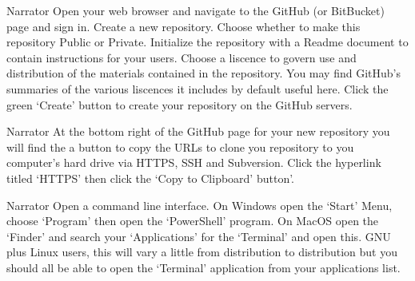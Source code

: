 \documentclass{screenplay} %
\begin{document}
\begin{dialogue}{Narrator} Open your web browser and navigate to the GitHub (or BitBucket) page and sign in.
\newline
\newline
Create a new repository.
\newline
\newline
Choose whether to make this repository Public or Private.
\newline
\newline
Initialize the repository with a Readme document to contain instructions for your users.
\newline
\newline
Choose a liscence to govern use and distribution of the materials contained in the repository.
You may find GitHub's summaries of the various liscences it includes by default useful here.
\newline
\newline
Click the green `Create' button to create your repository on the GitHub servers.
\end{dialogue}

\begin{dialogue}{Narrator}
At the bottom right of the GitHub page for your new repository you will find the a button to copy the URLs to clone you repository to you computer's hard drive via HTTPS, SSH and Subversion.
\newline
\newline
Click the hyperlink titled `HTTPS' then click the `Copy to Clipboard' button'.
\end{dialogue}

\begin{dialogue}{Narrator}
Open a command line interface.
\newline
\newline
On Windows open the `Start' Menu, choose `Program' then open the `PowerShell' program.
\newline
\newline
On MacOS open the `Finder' and search your `Applications' for the `Terminal' and open this.
\newline
\newline
GNU plus Linux users, this will vary a little from distribution to distribution but you should all be able to open the `Terminal' application from your applications list.
\end{dialogue}
\end{document}
